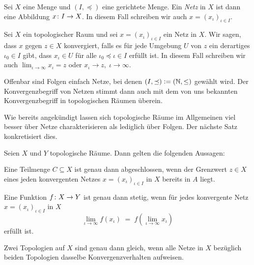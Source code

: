 \documentclass[../main/main.tex]{subfiles}
\begin{document}
	\begin{Definition}[Netz]
		Sei $X$ eine Menge und $(I, \preceq)$ eine gerichtete Menge. Ein \emph{Netz} in $X$ ist dann eine Abbildung $x \colon I \to X$. In diesem
		Fall schreiben wir auch $x = (x_\iota)_{\iota \in I}$.
	\end{Definition}

	\begin{Definition}
		Sei $X$ ein topologischer Raum und sei $x = (x_\iota)_{\iota \in I}$ ein Netz in $X$. Wir sagen, dass $x$ gegen $z \in X$ konvergiert, falls
		es für jede Umgebung $U$ von $z$ ein derartiges $\iota_0 \in I$ gibt, dass $x_\iota \in U$ für alle $\iota_0 \preceq \iota \in I$ erfüllt ist.
		In diesem Fall schreiben wir auch $\lim_{\iota \to \infty} x_\iota = z$ oder $x_\iota \to z, \; \iota \to \infty$.
	\end{Definition}

	\begin{Bemerkung}
		Offenbar sind Folgen einfach Netze, bei denen $(I, \preceq) \vcentcolon = (\mathbb{N}, \leq)$ gewählt wird. Der Konvergenzbegriff von Netzen stimmt
		dann auch mit dem von uns bekannten Konvergenzbegriff in topologischen Räumen überein.
	\end{Bemerkung}

	Wie bereits angekündigt lassen sich topologische Räume im Allgemeinen viel besser über Netze charakterisieren als lediglich über Folgen. Der nächste Satz
	konkretisiert dies.
	
	\begin{Satz}
		\label{thm:netconvergence}
		Seien $X$ und $Y$ topologische Räume. Dann gelten die folgenden Aussagen:
		\begin{enumeratethm}
			\item Eine Teilmenge $C \subseteq X$ ist genau dann abgeschlossen, wenn der Grenzwert $z \in X$ eines jeden konvergenten Netzes 
			$x = (x_\iota)_{\iota \in I}$ in $X$ bereits in $A$ liegt.
			\item Eine Funktion $f \colon X \to Y$ ist genau dann stetig, wenn für jedes konvergente Netz $x = (x_\iota)_{\iota \in I}$ in $X$ 
			\[ \lim_{\iota \to \infty} f(x_\iota) \; = \; f(\lim_{\iota \to \infty} x_\iota) \]
			erfüllt ist.
			\item Zwei Topologien auf $X$ sind genau dann gleich, wenn alle Netze in $X$ bezüglich beiden Topologien dasselbe Konvergenzverhalten aufweisen.
		\end{enumeratethm}
	\end{Satz}
\end{document}
